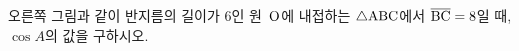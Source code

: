 \noindent\begin{minipage}[t]{0.58\linewidth}\vspace{0pt}\raggedright 오른쪽 그림과 같이 반지름의 길이가 $6$인 원~$\mathrm{O}$에 내접하는 $\triangle\mathrm{ABC}$에서 $\overline{\mathrm{BC}}=8$일 때, $\cos A$의 값을 구하시오.\end{minipage}\hfill\begin{minipage}[t]{0.4\linewidth}\vspace{0pt}\centering \resizebox{\ifdim\width>\linewidth\linewidth\else\width\fi}{!}{}\end{minipage}\par
